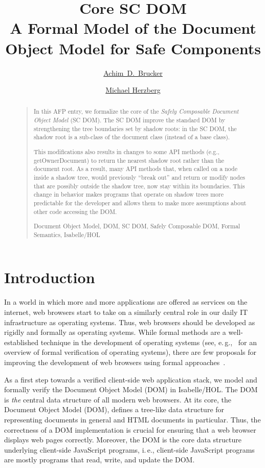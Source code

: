 \documentclass[10pt,DIV16,a4paper,abstract=true,twoside=semi,openright]
{scrreprt}
\title{Core SC DOM\\\medskip \Large 
  A Formal Model of the Document Object Model for Safe Components}%
\author{%
  \href{https://www.brucker.ch/}{Achim~D.~Brucker}\footnotemark[1]
  \and
  \href{https://www.michael-herzberg.de/}{Michael Herzberg}\footnotemark[2]
}
\newcommand{\ie}{i.\,e.\xspace}
\newcommand{\eg}{e.\,g.\xspace}
\begin{document}
  \maketitle
  \begin{abstract}
    \begin{quote}
      In this AFP entry, we formalize the core of the \emph{Safely
        Composable Document Object Model} (SC DOM). The SC DOM improve
      the standard DOM by strengthening the tree boundaries set by
      shadow roots: in the SC DOM, the shadow root is a sub-class of
      the document class (instead of a base class). 

      This modifications also results in changes to some API methods
      (e.g., getOwnerDocument) to return the nearest shadow root
      rather than the document root. As a result, many API methods
      that, when called on a node inside a shadow tree, would
      previously ``break out'' and return or modify nodes that are
      possibly outside the shadow tree, now stay within its
      boundaries. This change in behavior makes programs that operate
      on shadow trees more predictable for the developer and allows
      them to make more assumptions about other code accessing the
      DOM. 

      \bigskip
      Document Object Model, DOM, SC DOM, Safely Composable DOM, Formal Semantics, Isabelle/HOL      
    \end{quote}
  \end{abstract}


\tableofcontents
\cleardoublepage

\chapter{Introduction}
In a world in which more and more applications are offered as services
on the internet, web browsers start to take on a similarly central
role in our daily IT infrastructure as operating systems. Thus, web
browsers should be developed as rigidly and formally as operating
systems. While formal methods are a well-established technique in the
development of operating systems (see,
\eg,~\citet{klein:operating:2009} for an overview of formal
verification of operating systems), there are few proposals for
improving the development of web browsers using formal
approaches~\cite{gardner.ea:dom:2008,raad.ea:dom:2016,jang.ea:establishing:2012,bohannon.ea:featherweight:2010}.

As a first step towards a verified client-side web application stack,
we model and formally verify the Document Object Model (DOM) in
Isabelle/HOL\@. The DOM~\cite{whatwg:dom:2017,w3c:dom:2015} is
\emph{the} central data structure of all modern web browsers.  At its
core, the Document Object Model (DOM), defines a tree-like data
structure for representing documents in general and HTML documents in
particular. Thus, the correctness of a DOM implementation is crucial
for ensuring that a web browser displays web pages correctly.
Moreover, the DOM is the core data structure underlying client-side
JavaScript programs, \ie, client-side JavaScript programs are mostly
programs that read, write, and update the DOM.
\end{document}
